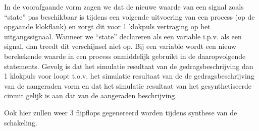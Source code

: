 In de voorafgaande vorm zagen we
dat de nieuwe waarde van een signal zoals ``state'' pas beschikbaar is
tijdens een volgende uitvoering van een process (op de opgaande klokflank)
en zorgt dit voor 1 klokpuls vertraging op het uitgangssignaal.
Wanneer we ``state'' declareren als een variable i.p.v. als een signal,
dan treedt dit verschijnsel niet op.
Bij een variable wordt een nieuw berekekende waarde in een process
onmiddelijk gebruikt in de daaropvolgende statements.
Gevolg is dat het simulatie resultaat van de gedragsbeschrijving dan
1 klokpuls voor loopt t.o.v. het simulatie resultaat van de
de gedragsbeschrijving van de aangeraden vorm en dat 
het simulatie resultaat van het gesynthetiseerde circuit gelijk is aan
dat van de aangeraden beschrijving.

Ook hier zullen weer 3 flipflops gegenereerd worden tijdens synthese
van de schakeling.
\cleardoublepage
